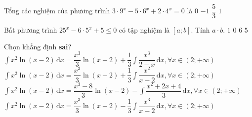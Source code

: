 \begin{ex}%
	Tổng các nghiệm của phương trình $3\cdot 9^x-5\cdot 6^x+2\cdot 4^x=0$ là
	\choice
	{$0$}
	{\True $-1$}
	{$\dfrac{5}{3}$}
	{$1$}
\end{ex}

\begin{ex}%
	Bất phương trình $25^x-6\cdot 5^x+5\leq 0$ có tập nghiệm là $[a;b]$. Tính $a\cdot b$. 
	\choice
	{$1$}
	{\True $0$}
	{$6$}
	{$5$}
\end{ex}

\begin{ex}%
	Chọn khẳng định \textbf{sai}? 
	\choice
	{$\displaystyle\int x^2\ln (x-2)\mathrm{\,d}x=\dfrac{x^3}{3}\ln (x-2)+\dfrac{1}{3}\displaystyle\int\dfrac{x^3}{2-x}\mathrm{\,d}x,\forall x\in(2;+\infty)$}
	{\True $\displaystyle\int x^2\ln (x-2)\mathrm{\,d}x=\dfrac{x^3}{3}\ln (x-2)+\dfrac{1}{3}\displaystyle\int\dfrac{x^2}{x-2}\mathrm{\,d}x,\forall x\in(2;+\infty)$}
	{$\displaystyle\int x^2\ln (x-2)\mathrm{\,d}x=\dfrac{x^3-8}{3}\ln (x-2)-\displaystyle\int\dfrac{x^2+2x+4}{3}\mathrm{\,d}x,\forall x\in(2;+\infty)$}
	{$\displaystyle\int x^2\ln (x-2)\mathrm{\,d}x=\dfrac{x^3}{3}\ln (x-2)-\dfrac{1}{3}\displaystyle\int\dfrac{x^3}{x-2}\mathrm{\,d}x,\forall x\in(2;+\infty)$}
\end{ex}

